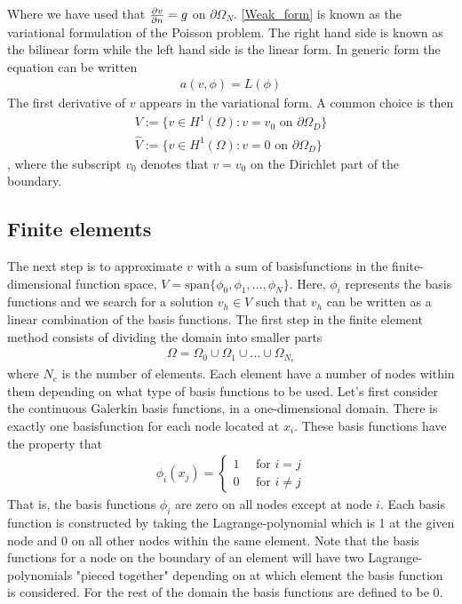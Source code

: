 Where we have used that $\frac{\partial v}{\partial n} = g$ on $\partial \Omega_N$. \eqref{Weak_form} is known as the variational formulation of the Poisson problem.  The right hand side is known as the bilinear form while the left hand side is the linear form. In generic form the equation can be written
\begin{align}
a(v,\phi) = L(\phi) \label{Bilinear}
\end{align}
The first derivative of $v$ appears in the variational form. A common choice is then
\begin{align}
 V := \{ v \in H^1(\Omega) : v = v_0 \text{ on } \partial \Omega_D \} \\
 \hat{V} := \{ v \in H^1(\Omega) : v = 0 \text{ on } \partial \Omega_D \}
\end{align}
, where the subscript $v_0$ denotes that $v = v_0$ on the Dirichlet part of the boundary. 
\subsection{Finite elements}
The next step is to approximate $v$ with a sum of basisfunctions in the finite-dimensional function space, $V = \text{span}\{\phi_0, \phi_1, ..., \phi_N \}$. Here, $\phi_i$ represents the basis functions and we search for a solution $v_h \in V$ such that $v_h$ can be written as a linear combination of the basis functions. 
The first step in the finite element method consists of dividing the domain into smaller parts
\begin{align*}
\Omega = \Omega_0 \cup \Omega_1 \cup ... \cup \Omega_{N_e}
\end{align*}
where $N_e$ is the number of elements. Each element have a number of nodes within them depending on what type of basis functions to be used. Let's first consider the continuous Galerkin basis functions, in a one-dimensional domain. There is exactly one basisfunction for each node located at $x_i$. These basis functions have the property that
\begin{align*}
\phi_i(x_j) = \begin{cases}
				1 \quad \text{ for } i=j \\
				0 \quad \text{ for } i\neq j
		 		\end{cases}
\end{align*}
That is, the basis functions $\phi_i$ are zero on all nodes except at node $i$. Each basis function is constructed by taking the Lagrange-polynomial which is 1 at the given node and 0 on all other nodes within the same element. Note that the basis functions for a node on the boundary of an element will have two Lagrange-polynomials "pieced together" depending on at which element the basis function is considered. For the rest of the domain the basis functions are defined to be 0. \\ \\

